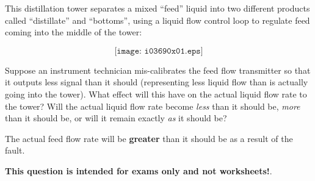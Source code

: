 

This distillation tower separates a mixed ``feed'' liquid into two different products called ``distillate'' and ``bottoms'', using a liquid flow control loop to regulate feed coming into the middle of the tower:

$$\texttt{[image: i03690x01.eps]}$$

Suppose an instrument technician mis-calibrates the feed flow transmitter so that it outputs less signal than it should (representing less liquid flow than is actually going into the tower).  What effect will this have on the actual liquid flow rate to the tower?  Will the actual liquid flow rate become {\it less} than it should be, {\it more} than it should be, or will it remain exactly {\it as} it should be?







The actual feed flow rate will be {\bf greater} than it should be as a result of the fault.







{\bf This question is intended for exams only and not worksheets!}.



